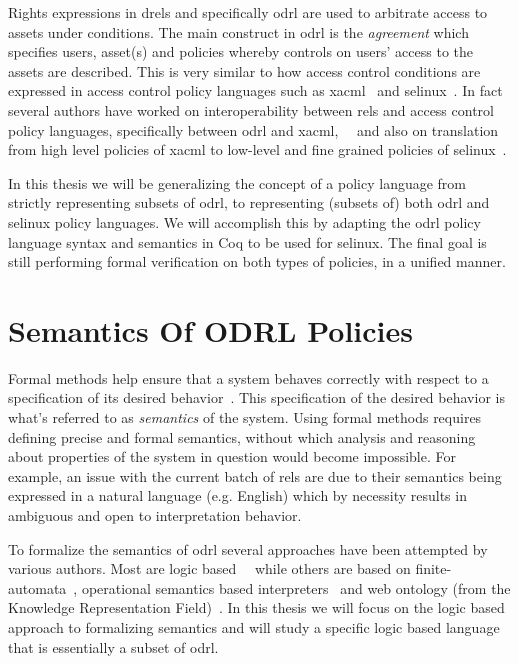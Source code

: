 Rights expressions in \ac{drel}s and specifically \ac{odrl} are used to arbitrate access to assets under conditions. The main construct in \ac{odrl} is the \emph{agreement} which specifies users, asset(s) and policies whereby controls on users' access to the assets are described. This is very similar to how access control conditions are expressed in access control policy languages such as \ac{xacml}~\cite{xacml} and \ac{selinux}~\cite{selinux}. In fact several authors have worked on interoperability between \ac{rel}s and access control policy languages, specifically between \ac{odrl} and \ac{xacml},~\cite{prados2005interoperability}~\cite{maronas2009architecture} and also on translation from high level policies of \ac{xacml} to low-level and fine grained policies of \ac{selinux}~\cite{alam2008usage}. 

In this thesis we will be generalizing the concept of a policy language from strictly representing subsets of \ac{odrl}, to representing (subsets of) both \ac{odrl} and \ac{selinux} policy languages. We will accomplish this by adapting the \ac{odrl} policy language syntax and semantics in Coq to be used for \ac{selinux}. The final goal is still performing formal verification on both types of policies, in a unified manner.



\section{Semantics Of ODRL Policies}


Formal methods help ensure that a system behaves correctly with respect to a specification of its desired behavior~\cite{TAPL}. This specification of the desired behavior is what's referred to as \emph{semantics} of the system. Using formal methods requires defining precise and formal semantics, without which analysis and reasoning about properties of the system in question would become impossible. For example, an issue with the current batch of \ac{rel}s are due to their semantics being expressed in a natural language (e.g. English) which by necessity results in ambiguous and open to interpretation behavior. 

To formalize the semantics of \ac{odrl} several approaches have been attempted by various authors. Most are logic based~\cite{Halpern2008}~\cite{pucella2006} while others are based on finite-automata~\cite{Holzer}, operational semantics based interpreters~\cite{Safavi-naini} and web ontology (from the Knowledge Representation Field)~\cite{Kasten2010MTS}. In this thesis we will focus on the logic based approach to formalizing semantics and will study a specific logic based language that is essentially a subset of \ac{odrl}.



